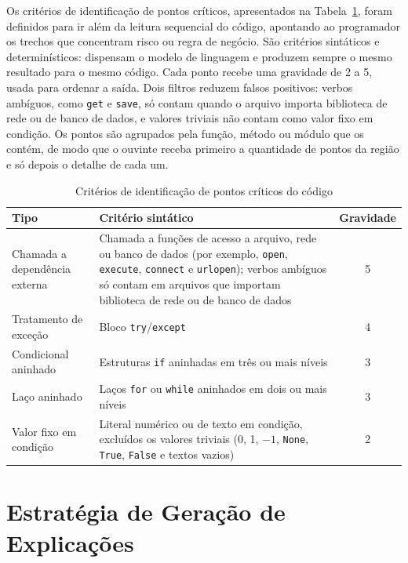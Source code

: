 \documentclass[
    12pt,                   %
    openright,              %
    oneside,                %
    a4paper,                %
    sumario=tradicional,    %
    english,                %
    brazil,                 %
    ]{abntex2}
\begin{document}
Os critérios de identificação de pontos críticos, apresentados na Tabela~\ref{tab:regras}, foram definidos para ir além da leitura sequencial do código, apontando ao programador os trechos que concentram risco ou regra de negócio. São critérios sintáticos e determinísticos: dispensam o modelo de linguagem e produzem sempre o mesmo resultado para o mesmo código. Cada ponto recebe uma gravidade de 2 a 5, usada para ordenar a saída. Dois filtros reduzem falsos positivos: verbos ambíguos, como \texttt{get} e \texttt{save}, só contam quando o arquivo importa biblioteca de rede ou de banco de dados, e valores triviais não contam como valor fixo em condição. Os pontos são agrupados pela função, método ou módulo que os contém, de modo que o ouvinte receba primeiro a quantidade de pontos da região e só depois o detalhe de cada um.

\begin{table}[htbp]
  \centering
  \caption{Critérios de identificação de pontos críticos do código}
  \label{tab:regras}
  \begin{tabular}{p{4.0cm}p{8.4cm}c}
    \toprule
    \textbf{Tipo} & \textbf{Critério sintático} & \textbf{Gravidade} \\
    \midrule
    Chamada a dependência externa & Chamada a funções de acesso a arquivo, rede ou banco de dados (por exemplo, \texttt{open}, \texttt{execute}, \texttt{connect} e \texttt{urlopen}); verbos ambíguos só contam em arquivos que importam biblioteca de rede ou de banco de dados & 5 \\
    Tratamento de exceção & Bloco \texttt{try}/\texttt{except} & 4 \\
    Condicional aninhado & Estruturas \texttt{if} aninhadas em três ou mais níveis & 3 \\
    Laço aninhado & Laços \texttt{for} ou \texttt{while} aninhados em dois ou mais níveis & 3 \\
    Valor fixo em condição & Literal numérico ou de texto em condição, excluídos os valores triviais (0, 1, $-1$, \texttt{None}, \texttt{True}, \texttt{False} e textos vazios) & 2 \\
    \bottomrule
  \end{tabular}
\end{table}

\section{Estratégia de Geração de Explicações}\label{sec:estrategia}
\end{document}
